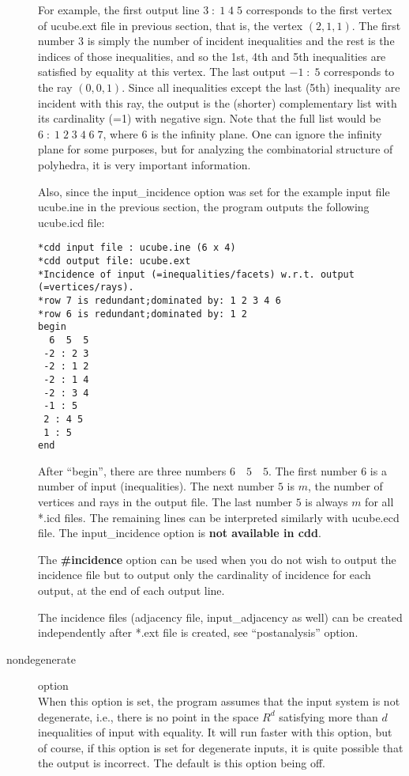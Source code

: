 \documentclass[11pt]{article}
\begin{document}
\begin{description}
For example, the first output line $3 \; : \; 1 \; 4 \; 5$ 
corresponds to the
first vertex of ucube.ext file in previous section, that is, 
the vertex $(2, 1, 1)$.  The first number $3$ is simply the number
of incident inequalities and the rest is the indices of
those inequalities, and so the 1st, 4th and 5th inequalities are
satisfied by equality at this vertex.   The last output
$-1 \; : \; 5$ corresponds to the ray  $(0,0,1)$.  Since all inequalities
except the last (5th) inequality are incident with this ray,
the output is the  (shorter) complementary list with its cardinality (=1) with negative
sign.  Note that the full list would be $6 \; : \; 1 \; 2 \; 3 \; 4 \; 6 \; 7$, where
$6$ is the infinity plane.  One can ignore the infinity
plane for some purposes,  but for analyzing the combinatorial 
structure of polyhedra, it is
very important information.

Also, since the input\_incidence option was set for the example input file ucube.ine in
the previous section, the program outputs the following ucube.icd file:
\begin{verbatim}
*cdd input file : ucube.ine (6 x 4)
*cdd output file: ucube.ext
*Incidence of input (=inequalities/facets) w.r.t. output (=vertices/rays).
*row 7 is redundant;dominated by: 1 2 3 4 6
*row 6 is redundant;dominated by: 1 2
begin
  6  5  5
 -2 : 2 3
 -2 : 1 2
 -2 : 1 4
 -2 : 3 4
 -1 : 5
 2 : 4 5
 1 : 5
end
\end{verbatim}
After ``begin'', there are three numbers $6 \quad 5 \quad 5$.
The first number $6$ is a number of input (inequalities).
The next number $5$ is $m$, the number of vertices and rays in the output file.
The last number $5$ is always  $m$ for all *.icd files.  The remaining
lines can be interpreted similarly with ucube.ecd file.  The input\_incidence
option is {\bf not available in cdd\/}.


The {\bf \#incidence} option can be used when you do not wish
to output the incidence file but to output only the cardinality of incidence
for each output, at the end of each output line.

The incidence files (adjacency file, input\_adjacency as well) 
can be created independently
after *.ext file is created, see ``postanalysis'' option. 
 
\item[nondegenerate] option\\
When this option is set, the program assumes that the input system
is not degenerate, i.e., there is no point in the space $R^d$ satisfying
more than $d$ inequalities of input with equality.
It will run faster with this option, but of course, 
if this option is set for degenerate inputs, it is 
quite possible that the output is incorrect.  
The default is this option being off.


\end{description}
\end{document}
